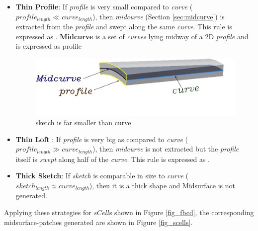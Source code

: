 \begin{itemize}[noitemsep,topsep=2pt,parsep=2pt,partopsep=2pt]

\item {\bf Thin Profile}: If {\em profile} is very small compared to {\em curve} ( $profile_{length} \ll curve_{length}$), then {\em midcurve} (Section \ref{sec:midcurve}) is extracted from the {\em profile} and swept  along the same {\em curve}. This rule is expressed as  . {\bf Midcurve} is a set of {\em curves} lying midway of a 2D {\em profile} and is expressed as 	 {profile} 

\begin{figure}[h]
\centering \includegraphics[scale=0.35]{../Common/images//MidsurfSmallProfile_1.pdf} 
\caption{sketch is far smaller than curve}
\label{figure_MidsurfSmallProfile}
\end{figure}

\item {\bf Thin Loft} :  If {\em profile} is very big as compared to {\em curve} ($profile_{length} \gg curve_{length}$), then {\em midcurve} is not extracted  but the {\em profile} itself is {\em swept} along half of the {\em curve}. This rule is expressed as .
%

\item {\bf Thick Sketch}:   If {\em sketch} is comparable in size to {\em curve}  ($sketch_{length} \approx curve_{length}$), then it is a thick shape and Midsurface is not generated.

\end{itemize}

Applying these strategies for $sCell$s shown in Figure \ref{fig_fbcd}, the corresponding midsurface-patches generated are shown in Figure \ref{fig_scells}. 
	
